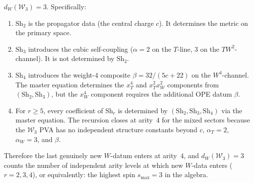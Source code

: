 \documentclass[11pt]{article}
\newcommand{\cW}{\mathcal{W}}
\begin{document}
\begin{proposition}[$W$-essential depth of $\cW_3$]
\label{prop:w3-essential-depth}
$d_W(\cW_3) = 3$.  Specifically:
\begin{enumerate}[label=\textup{(\roman*)}]
\item $\mathrm{Sh}_2$ is the propagator data (the central charge
  $c$).  It determines the metric on the primary space.
\item $\mathrm{Sh}_3$ introduces the cubic self-coupling
  ($\alpha = 2$ on the $T$-line, $3$ on the $TW^2$-channel).
  It is not determined by $\mathrm{Sh}_2$.
\item $\mathrm{Sh}_4$ introduces the weight-$4$ composite
  $\beta = 32/(5c+22)$ on the $W^4$-channel.  The master
  equation determines the $x_T^4$ and $x_T^2 x_W^2$ components
  from $(\mathrm{Sh}_2, \mathrm{Sh}_3)$, but the $x_W^4$
  component requires the additional OPE datum $\beta$.
\item For $r \ge 5$, every coefficient of $\mathrm{Sh}_r$ is
  determined by $(\mathrm{Sh}_2, \mathrm{Sh}_3, \mathrm{Sh}_4)$
  via the master equation.  The recursion closes at arity~$4$
  for the mixed sectors because the $\cW_3$ PVA has no
  independent structure constants beyond $c$, $\alpha_T = 2$,
  $\alpha_W = 3$, and $\beta$.
\end{enumerate}
Therefore the last genuinely new $W$-datum enters at arity~$4$,
and $d_W(\cW_3) = 3$ counts the number of independent
arity levels at which new $W$-data enters ($r = 2, 3, 4$),
or equivalently: the highest spin $s_{\max} = 3$ in the algebra.
\end{proposition}
\end{document}
